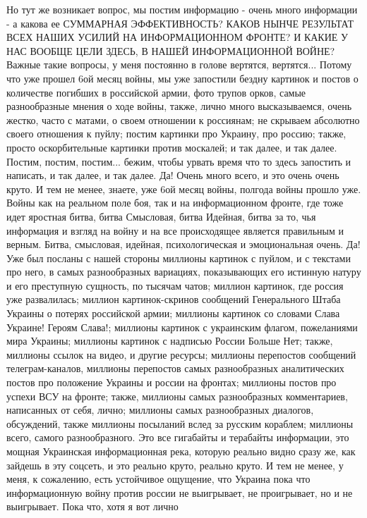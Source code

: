 Но тут же возникает вопрос, мы постим информацию - очень много информации - а
какова ее СУММАРНАЯ ЭФФЕКТИВНОСТЬ? КАКОВ НЫНЧЕ РЕЗУЛЬТАТ ВСЕХ НАШИХ УСИЛИЙ НА
ИНФОРМАЦИОННОМ ФРОНТЕ? И КАКИЕ У НАС ВООБЩЕ ЦЕЛИ ЗДЕСЬ, В НАШЕЙ ИНФОРМАЦИОННОЙ
ВОЙНЕ?  Важные такие вопросы, у меня постоянно в голове вертятся, вертятся...
Потому что уже прошел 6ой месяц войны, мы уже запостили бездну картинок и
постов о количестве погибших в российской армии, фото трупов орков, самые разнообразные мнения о
ходе войны, также, лично много высказываемся, очень жестко, часто с матами, о
своем отношении к россиянам; не скрываем абсолютно своего отношения к пуйлу; постим
картинки про Украину, про россию; также, просто оскорбительные картинки против
москалей; и так далее, и так далее.  Постим, постим, постим... бежим, чтобы
урвать время что то здесь запостить и написать, и так далее, и так далее.  Да!
Очень много всего, и это очень очень круто. И тем не менее, знаете, уже 6ой
месяц войны, полгода войны прошло уже. Войны как на реальном поле боя, так и на
информационном фронте, где тоже идет яростная битва, битва Смысловая, битва
Идейная, битва за то, чья информация и взгляд на войну и на все происходящее
является правильным и верным. Битва, смысловая, идейная, психологическая и
эмоциональная очень.  Да!  Уже был посланы с нашей стороны миллионы картинок с
пуйлом, и с текстами про него, в самых разнообразных вариациях, показывающих
его истинную натуру и его преступную сущность, по тысячам чатов; миллион
картинок, где россия уже развалилась; миллион картинок-скринов сообщений
Генерального Штаба Украины о потерях российской армии; миллионы картинок со
словами Слава Украине! Героям Слава!; миллионы картинок с украинским флагом,
пожеланиями мира Украины; миллионы картинок с надписью России Больше Нет;
также, миллионы ссылок на видео, и другие ресурсы; миллионы перепостов
сообщений телеграм-каналов, миллионы перепостов самых разнообразных
аналитических постов про положение Украины и россии на фронтах; миллионы постов
про успехи ВСУ на фронте; также, миллионы самых разнообразных комментариев,
написанных от себя, лично; миллионы самых разнообразных диалогов, обсуждений,
также миллионы посыланий вслед за русским кораблем; миллионы всего, самого
разнообразного. Это все гигабайты и терабайты информации, это мощная Украинская
информационная река, которую реально видно сразу же, как зайдешь в эту соцсеть,
и это реально круто, реально круто. И тем не менее, у меня, к сожалению, есть
устойчивое ощущение, что Украина пока что информационную войну против россии не
выигрывает, не проигрывает, но и не выигрывает. Пока что, хотя я вот лично
